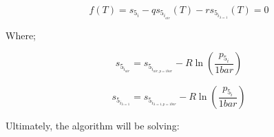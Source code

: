 \documentclass[titlepage]{article}
\begin{document}
    \begin{equation}
        f(T) = s_{5_{i}} - q s_{5_{i_{air}}}(T) - r s_{5_{i_{\lambda=1}}}(T) = 0
    \end{equation}

    Where;

    \begin{equation}
        s_{5_{i_{air}}} = s_{5_{i_{air, p=1 bar}}} - R \ln \left( \frac{p_{5_{i}}}{1 bar} \right)
    \end{equation}

    \begin{equation}
        s_{5_{i_{\lambda=1}}} = s_{5_{i_{\lambda=1, p=1 bar}}} - R \ln \left( \frac{p_{5_{i}}}{1 bar} \right)
    \end{equation}

    Ultimately, the algorithm will be solving:
\end{document}
